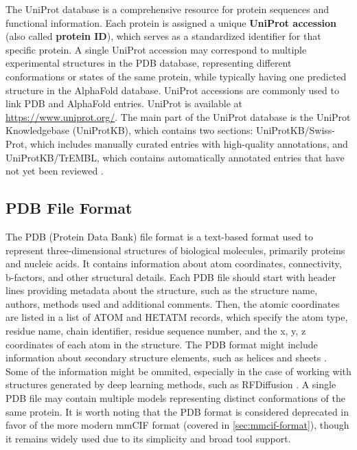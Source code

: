 The UniProt database \cite{uniprot2025uniprot} is a comprehensive resource for protein sequences and functional information. Each protein is assigned a unique \textbf{UniProt accession} (also called \textbf{protein ID}), which serves as a standardized identifier for that specific protein. A single UniProt accession may correspond to multiple experimental structures in the PDB database, representing different conformations or states of the same protein, while typically having one predicted structure in the AlphaFold database. UniProt accessions are commonly used to link PDB and AlphaFold entries. UniProt is available at \url{https://www.uniprot.org/}. The main part of the UniProt database is the UniProt Knowledgebase (UniProtKB), which contains two sections: UniProtKB/Swiss-Prot, which includes manually curated entries with high-quality annotations, and UniProtKB/TrEMBL, which contains automatically annotated entries that have not yet been reviewed \cite{boutet2016uniprotkb}.

\subsection{PDB File Format}
\label{sec:pdb-format}

The PDB (Protein Data Bank) file format is a text-based format used to represent three-dimensional structures of biological molecules, primarily proteins and nucleic acids. It contains information about atom coordinates, connectivity, b-factors, and other structural details. Each PDB file should start with header lines providing metadata about the structure, such as the structure name, authors, methods used and additional comments. Then, the atomic coordinates are listed in a list of ATOM and HETATM records, which specify the atom type, residue name, chain identifier, residue sequence number, and the x, y, z coordinates of each atom in the structure. The PDB format might include information about secondary structure elements, such as helices and sheets \cite{westbrook2003pdb}. Some of the information might be ommited, especially in the case of working with structures generated by deep learning methods, such as RFDiffusion \cite{watson2023novo}. A single PDB file may contain multiple models representing distinct conformations of the same protein. It is worth noting that the PDB format is considered deprecated in favor of the more modern mmCIF format (covered in \ref{sec:mmcif-format}), though it remains widely used due to its simplicity and broad tool support.

